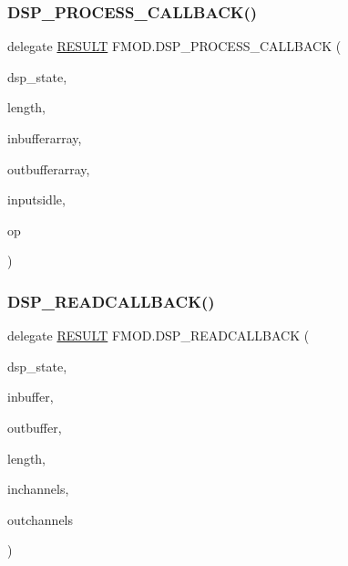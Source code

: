 \subsubsection{\texorpdfstring{D\+S\+P\+\_\+\+P\+R\+O\+C\+E\+S\+S\+\_\+\+C\+A\+L\+L\+B\+A\+C\+K()}{DSP\_PROCESS\_CALLBACK()}}
{\footnotesize\ttfamily delegate \hyperlink{namespace_f_m_o_d_a305d1176ef3f8c8815861a60407ac33d}{R\+E\+S\+U\+LT} F\+M\+O\+D.\+D\+S\+P\+\_\+\+P\+R\+O\+C\+E\+S\+S\+\_\+\+C\+A\+L\+L\+B\+A\+CK (\begin{DoxyParamCaption}\item[{ref \hyperlink{struct_f_m_o_d_1_1_d_s_p___s_t_a_t_e}{D\+S\+P\+\_\+\+S\+T\+A\+TE}}]{dsp\+\_\+state,  }\item[{uint}]{length,  }\item[{ref \hyperlink{struct_f_m_o_d_1_1_d_s_p___b_u_f_f_e_r___a_r_r_a_y}{D\+S\+P\+\_\+\+B\+U\+F\+F\+E\+R\+\_\+\+A\+R\+R\+AY}}]{inbufferarray,  }\item[{ref \hyperlink{struct_f_m_o_d_1_1_d_s_p___b_u_f_f_e_r___a_r_r_a_y}{D\+S\+P\+\_\+\+B\+U\+F\+F\+E\+R\+\_\+\+A\+R\+R\+AY}}]{outbufferarray,  }\item[{bool}]{inputsidle,  }\item[{\hyperlink{namespace_f_m_o_d_a4972a4698fe1c6d24a9b2f3704dfe42e}{D\+S\+P\+\_\+\+P\+R\+O\+C\+E\+S\+S\+\_\+\+O\+P\+E\+R\+A\+T\+I\+ON}}]{op }\end{DoxyParamCaption})}

\mbox{\label{namespace_f_m_o_d_a84203ed1830a5522384e1c84c8d13c7f}} 
\subsubsection{\texorpdfstring{D\+S\+P\+\_\+\+R\+E\+A\+D\+C\+A\+L\+L\+B\+A\+C\+K()}{DSP\_READCALLBACK()}}
{\footnotesize\ttfamily delegate \hyperlink{namespace_f_m_o_d_a305d1176ef3f8c8815861a60407ac33d}{R\+E\+S\+U\+LT} F\+M\+O\+D.\+D\+S\+P\+\_\+\+R\+E\+A\+D\+C\+A\+L\+L\+B\+A\+CK (\begin{DoxyParamCaption}\item[{ref \hyperlink{struct_f_m_o_d_1_1_d_s_p___s_t_a_t_e}{D\+S\+P\+\_\+\+S\+T\+A\+TE}}]{dsp\+\_\+state,  }\item[{Int\+Ptr}]{inbuffer,  }\item[{Int\+Ptr}]{outbuffer,  }\item[{uint}]{length,  }\item[{int}]{inchannels,  }\item[{ref int}]{outchannels }\end{DoxyParamCaption})}

